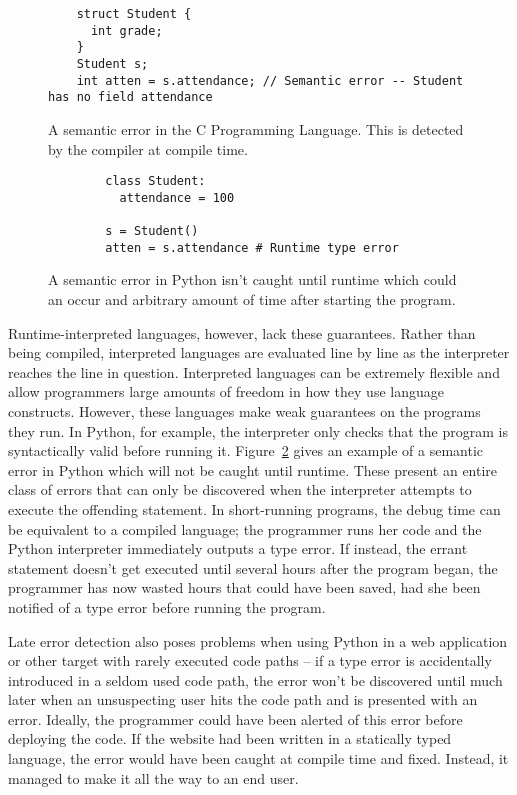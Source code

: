 \documentclass{article}[12pt]
\begin{document}
\begin{figure} \begin{verbatim} 
    struct Student { 
      int grade; 
    } 
    Student s; 
    int atten = s.attendance; // Semantic error -- Student has no field attendance 
  \end{verbatim} 
  \caption{A semantic error in the C Programming Language. This is
    detected by the compiler at compile time.} 
  \label{fig:csemanticerror}
\end{figure}

\begin{figure}
    \begin{verbatim}
        class Student:
          attendance = 100

        s = Student()
        atten = s.attendance # Runtime type error
    \end{verbatim}
    \caption{A semantic error in Python isn't caught until runtime which could an occur and
    arbitrary amount of time after starting the program.}
    \label{fig:pythonsemanticerror}
\end{figure}

Runtime-interpreted languages, however, lack these guarantees. Rather than being compiled,
interpreted languages are evaluated line by line as the interpreter reaches the line in question.
Interpreted languages can be extremely flexible and allow programmers large amounts of freedom in
how they use language constructs. However, these languages make weak guarantees on the programs they
run. In Python, for example, the interpreter only checks that the program is syntactically valid
before running it. Figure~\ref{fig:pythonsemanticerror} gives an example of a semantic error in
Python which will not be caught until runtime. These present an entire class of errors that can only
be discovered when the interpreter attempts to execute the offending statement. In short-running
programs, the debug time can be equivalent to a compiled language; the programmer runs her code and
the Python interpreter immediately outputs a type error. If instead, the errant statement doesn't
get executed until several hours after the program began, the programmer has now wasted hours that
could have been saved, had she been notified of a type error before running the program. 

Late error detection also poses problems when using Python in a web application or other target with rarely executed
code paths -- if a type error is accidentally introduced in a seldom used code path, the error won't be discovered until
much later when an unsuspecting user hits the code path and is presented with an error. Ideally, the programmer could have been
alerted of this error before deploying the code. If the website had been written in a statically typed language, the
error would have been caught at compile time and fixed. Instead, it managed to make it all the way to an end user.
\end{document}
